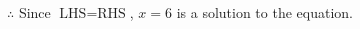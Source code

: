 \documentclass[12pt]{article}
\begin{document}
\begin{multicols}{2}
\begin{minipage}[t]{0.40\textwidth}
    \noindent \(\therefore\) Since \(\text{LHS} = \text{RHS}\), \(x = 6\) is  a solution to the equation.

\end{minipage}

 \vspace*{16pt}
\newpage

\end{multicols}
\end{document}
